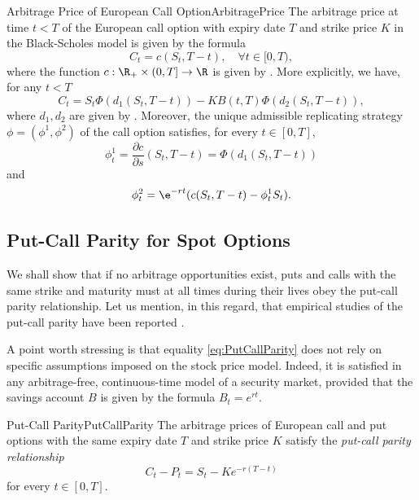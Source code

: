 \begin{thm}{Arbitrage Price of European Call Option}{ArbitragePrice}
	The arbitrage price at time $t < T$ of the European call option with expiry date $T$ and strike price $K$ in the Black-Scholes model is given by the formula
	\begin{equation}
		C_t = c(S_t, T - t), \quad \forall t \in [0, T),
		\label{eq:BsPrice}
	\end{equation}
	where the function $c : \R_+ \times (0, T] \to \R$ is given by . More explicitly, we have, for any $t < T$
	\begin{equation*}
		C_t = S_t \Phi(d_1(S_t, T - t)) - K B(t, T) \Phi(d_2(S_t, T - t)),
	\end{equation*}
	where $d_1, d_2$ are given by . Moreover, the unique admissible replicating strategy $\phi = (\phi^1, \phi^2)$ of the call option satisfies, for every $t \in [0, T]$,
	\begin{equation*}
		\phi^1_t = \frac{\partial c}{\partial s}(S_t, T - t) = \Phi(d_1(S_t, T - t))
	\end{equation*}
	and
	\begin{equation*}
		\phi^2_t = \e^{-rt} (c(S_t, T - t) - \phi^1_t S_t).
	\end{equation*}
\end{thm}



\subsection{Put-Call Parity for Spot Options}
We shall show that if no arbitrage opportunities exist, puts and calls with the same strike and maturity must at all times during their lives obey the put-call parity relationship. Let us mention, in this regard, that empirical studies of the put-call parity have been reported \citep{gouldTransactionsCostsRelationship1974,klemkoskyPutCallParityMarket1979}.

A point worth stressing is that equality \eqref{eq:PutCallParity} does not rely on specific assumptions imposed on the stock price model. Indeed, it is satisfied in any arbitrage-free, continuous-time model of a security market, provided that the savings account $B$ is given by the formula $B_t = e^{rt}$.

\begin{prop}{Put-Call Parity}{PutCallParity}
	The arbitrage prices of European call and put options with the same expiry date $T$ and strike price $K$ satisfy the \textit{put-call parity relationship}
	\begin{equation} \label{eq:PutCallParity}
		C_t - P_t = S_t - K e^{-r(T-t)}
	\end{equation}
	for every $t \in [0, T]$.
\end{prop}

